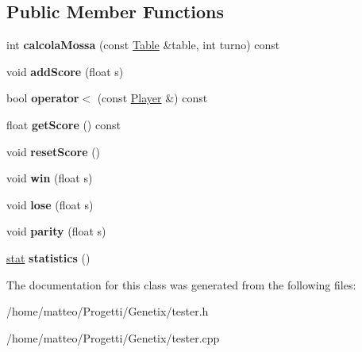 \subsection*{Public Member Functions}
\begin{DoxyCompactItemize}
\item 
\mbox{\label{classTester_ac7ccbb8c1f95afbcd662688081166ce0}} 
int {\bfseries calcola\+Mossa} (const \hyperlink{classTable}{Table} \&table, int turno) const
\item 
\mbox{\label{classTester_a771e1a605ae0dcf7d1a201b7cb1e9afb}} 
void {\bfseries add\+Score} (float s)
\item 
\mbox{\label{classTester_a166f47c5c14af7202306e7092e76dabb}} 
bool {\bfseries operator$<$} (const \hyperlink{classPlayer}{Player} \&) const
\item 
\mbox{\label{classTester_a535185d2f64e214bea45ee84d193745c}} 
float {\bfseries get\+Score} () const
\item 
\mbox{\label{classTester_a330d84c8496c809ed8a3218afbca0431}} 
void {\bfseries reset\+Score} ()
\item 
\mbox{\label{classTester_a36f76c397767071c62a7fe21f7818613}} 
void {\bfseries win} (float s)
\item 
\mbox{\label{classTester_a96a762993c9781ccd6817edc6ee30907}} 
void {\bfseries lose} (float s)
\item 
\mbox{\label{classTester_a8292709ff6d1daf1a7998e09892be659}} 
void {\bfseries parity} (float s)
\item 
\mbox{\label{classTester_a0cb4798fcc36d5ce1e0b8a85a6b5c74d}} 
\hyperlink{structstat}{stat} {\bfseries statistics} ()
\end{DoxyCompactItemize}


The documentation for this class was generated from the following files\+:\begin{DoxyCompactItemize}
\item 
/home/matteo/\+Progetti/\+Genetix/tester.\+h\item 
/home/matteo/\+Progetti/\+Genetix/tester.\+cpp\end{DoxyCompactItemize}
